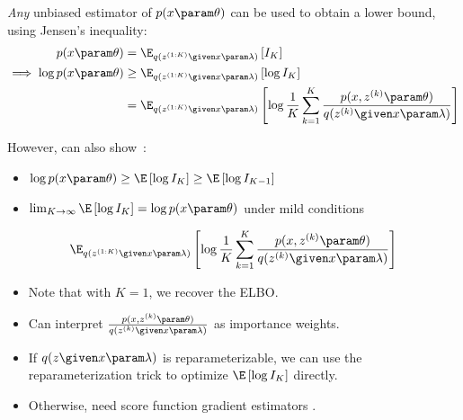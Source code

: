 \begin{frame}
    \textit{Any} unbiased estimator of $p(x \param \theta)$ can be used to obtain a lower bound, using Jensen's inequality:
    \begin{align*}
        p(x \param \theta) &= \E_{q(z^{(1:K)} \given x \param \lambda)} \left[ I_K \right] \\
        \implies \log p(x \param \theta) &\geq \E_{q(z^{(1:K)} \given x \param \lambda)} \left[ \log I_K \right] \\
        &= \E_{q(z^{(1:K)} \given x \param \lambda)} \left[ \log \frac{1}{K} \sum_{k=1}^K \frac{p(x, z^{(k)} \param \theta)}{q(z^{(k)} \given x \param \lambda)} \right]
    \end{align*}

However, can also show~\citep{Burda2015}:
\begin{itemize}
    \item $\log p(x \param \theta) \geq \E \left[ \log I_K \right] \geq \E \left[ \log I_{K-1} \right]$
    \item $\lim_{K \rightarrow \infty} \E \left[ \log I_K \right] = \log p(x \param \theta)$ under mild conditions
\end{itemize}
\end{frame}

\begin{frame}
\[ \E_{q(z^{(1:K)} \given x \param \lambda)} \left[ \log \frac{1}{K} \sum_{k=1}^K \frac{p(x, z^{(k)} \param \theta)}{q(z^{(k)} \given x \param \lambda)} \right] 
\]
    \begin{itemize}
      \item Note that with $K=1$, we recover the ELBO.
      \item Can interpret $\frac{p(x, z^{(k)} \param \theta)}{q(z^{(k)} \given x \param \lambda)}$ as importance weights.
        \item If $q(z \given x \param \lambda)$ is reparameterizable, we can use the reparameterization trick to optimize $\E \left[ \log I_K \right]$ directly.
        \item Otherwise, need score function gradient estimators \citep{Mnih2016}.
    \end{itemize}
\end{frame}



